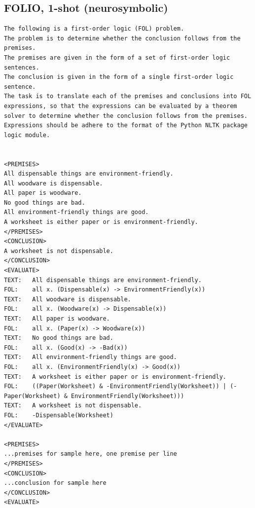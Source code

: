 \subsection{FOLIO, 1-shot (neurosymbolic)} \label{sec:folio1shotexample}
\begin{lstlisting}[breaklines=true]
The following is a first-order logic (FOL) problem.
The problem is to determine whether the conclusion follows from the premises.
The premises are given in the form of a set of first-order logic sentences.
The conclusion is given in the form of a single first-order logic sentence.
The task is to translate each of the premises and conclusions into FOL expressions, so that the expressions can be evaluated by a theorem solver to determine whether the conclusion follows from the premises.
Expressions should be adhere to the format of the Python NLTK package logic module.


<PREMISES>
All dispensable things are environment-friendly.
All woodware is dispensable.
All paper is woodware.
No good things are bad.
All environment-friendly things are good.
A worksheet is either paper or is environment-friendly.
</PREMISES>
<CONCLUSION>
A worksheet is not dispensable.
</CONCLUSION>
<EVALUATE>
TEXT:	All dispensable things are environment-friendly.
FOL:	all x. (Dispensable(x) -> EnvironmentFriendly(x))
TEXT:	All woodware is dispensable.
FOL:	all x. (Woodware(x) -> Dispensable(x))
TEXT:	All paper is woodware.
FOL:	all x. (Paper(x) -> Woodware(x))
TEXT:	No good things are bad.
FOL:	all x. (Good(x) -> -Bad(x))
TEXT:	All environment-friendly things are good.
FOL:	all x. (EnvironmentFriendly(x) -> Good(x))
TEXT:	A worksheet is either paper or is environment-friendly.
FOL:	((Paper(Worksheet) & -EnvironmentFriendly(Worksheet)) | (-Paper(Worksheet) & EnvironmentFriendly(Worksheet)))
TEXT:	A worksheet is not dispensable.
FOL:	-Dispensable(Worksheet)
</EVALUATE>

<PREMISES>
...premises for sample here, one premise per line
</PREMISES>
<CONCLUSION>
...conclusion for sample here
</CONCLUSION>
<EVALUATE>
\end{lstlisting}